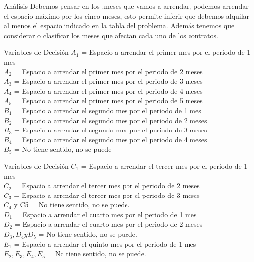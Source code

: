 \documentclass{beamer}
\begin{document}
\begin{frame}[fragile]{An\'alisis}
Debemos pensar en los .meses que vamos a arrendar, podemos arrendar el espacio m\'aximo por los cinco meses, esto permite inferir que debemos alquilar al menos el espacio indicado en la tabla del problema. Adem\'as tenemos que considerar o clasificar los meses que afectan cada uno de los contratos.

\end{frame}
\begin{frame}[fragile]{Variables de Decisi\'on}
\(A_{1}\) = Espacio a arrendar el primer mes por el periodo de 1 mes\\
\(A_{2}\) = Espacio a arrendar el primer mes por el periodo de 2 meses\\
\(A_{3}\) = Espacio a arrendar el primer mes por el periodo de 3 meses\\
\(A_{4}\) = Espacio a arrendar el primer mes por el periodo de 4 meses\\
\(A_{5}\) = Espacio a arrendar el primer mes por el periodo de 5 meses\\
\(B_{1}\) = Espacio a arrendar el segundo mes por el periodo de 1 mes\\
\(B_{2}\) = Espacio a arrendar el segundo mes por el periodo de 2 meses\\
\(B_{3}\) = Espacio a arrendar el segundo mes por el periodo de 3 meses\\
\(B_{4}\) = Espacio a arrendar el segundo mes por el periodo de 4 meses\\
\(B_{5}\) = No tiene sentido, no se puede\\
\end{frame}
\begin{frame}[fragile]{Variables de Decisi\'on}
\(C_{1}\) = Espacio a arrendar el tercer mes por el periodo de 1 mes\\
\(C_{2}\) = Espacio a arrendar el tercer mes por el periodo de 2 meses\\
\(C_{3}\) = Espacio a arrendar el tercer mes por el periodo de 3 meses\\
\(C_{4}\) y C5 =  No tiene sentido, no se puede.\\
\(D_{1}\) = Espacio a arrendar el cuarto mes por el periodo de 1 mes\\
\(D_{2}\) = Espacio a arrendar el cuarto mes por el periodo de 2 meses\\
\(D_{3}, D_{4} y D_{5}\) =  No tiene sentido, no se puede.\\
\(E_{1}\) = Espacio a arrendar el quinto mes por el periodo de 1 mes\\
\(E_{2} , E_{3}, E_{4}, E_{5}\) =  No tiene sentido, no se puede.\\

\end{frame}
\end{document}
